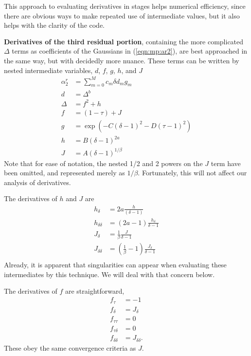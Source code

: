 This approach to evaluating derivatives in stages helps numerical efficiency, since there are obvious ways to make repeated use of intermediate values, but it also helps with the clarity of the code.  

\textbf{Derivatives of the third residual portion}, containing the more complicated $\Delta$ terms as coefficients of the Gaussians in (\ref{eqn:mp:ar2}), are best approached in the same way, but with decidedly more nuance.  These terms can be written by nested intermediate variables, $d$, $f$, $g$, $h$, and $J$
\begin{subequations}
\begin{align}
\alpha^r_2 &= \sum^M_{m=0} c_m \delta d_m g_m\\
d &= \Delta^b\\
\Delta &= f^2 + h\\
f &= (1-\tau) + J\\
g &= \exp\left(-C (\delta-1)^2 - D(\tau-1)^2\right)\\
h &= B\left(\delta - 1\right)^{2a}\\
J &= A\left(\delta-1\right)^{1/\beta}
\end{align}
\end{subequations}
Note that for ease of notation, the nested 1/2 and 2 powers on the $J$ term have been omitted, and represented merely as $1/\beta$.  Fortunately, this will not affect our analysis of derivatives.

The derivatives of $h$ and $J$ are
\begin{subequations}
\begin{align}
h_\delta &= 2a \frac{h}{(\delta-1)}\\
h_{\delta\delta} &= (2a-1) \frac{h_\delta}{\delta-1}\\
J_\delta &= \frac{1}{\beta}\frac{J}{\delta-1}\\
J_{\delta\delta} &= \left(\frac{1}{\beta} - 1\right)\frac{J_\delta}{\delta-1}\\
\end{align}
\end{subequations}
Already, it is apparent that singularities can appear when evaluating these intermediates by this technique.  We will deal with that concern below.

The derivatives of $f$ are straightforward,
\begin{subequations}
\begin{align}
f_{\tau} &= -1\\
f_{\delta} &= J_\delta\\
f_{\tau\tau} &= 0\\
f_{\tau\delta} &= 0\\
f_{\delta\delta} &= J_{\delta\delta}.
\end{align}
\end{subequations}
These obey the same convergence criteria as $J$.

